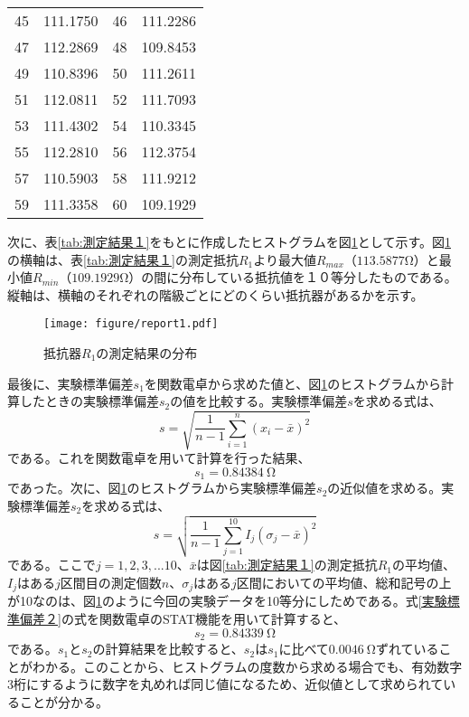 \documentclass[10pt,a4paper]{jsarticle}
\numberwithin{equation}{section}
\numberwithin{figure}{section}
\numberwithin{table}{section}
\begin{document}
\begin{table}[H]
\begin{center}
{\begin{tabular}{|c|c|c|c|}
          45&111.1750&46&111.2286\\
          47&112.2869&48&109.8453\\
          49&110.8396&50&111.2611\\
          51&112.0811&52&111.7093\\
          53&111.4302&54&110.3345\\
          55&112.2810&56&112.3754\\
          57&110.5903&58&111.9212\\
          59&111.3358&60&109.1929\\
          \hline
        \end{tabular}
      }
    \end{center}
  \end{table}
  \newpage
  次に、表\ref{tab:測定結果１}をもとに作成したヒストグラムを図\ref{fig:結果分布}として示す。図\ref{fig:結果分布}の横軸は、表\ref{tab:測定結果１}の測定抵抗$R_1$より最大値$R_{max}$（$113.5877\si{\ohm}$）と最小値$R_{min}$（$109.1929\si{\ohm}$）の間に分布している抵抗値を１０等分したものである。縦軸は、横軸のそれぞれの階級ごとにどのくらい抵抗器があるかを示す。
  \begin{figure}[H]
    \begin{center}
      \texttt{[image: figure/report1.pdf]}
      \caption{抵抗器$R_1$の測定結果の分布}\label{fig:結果分布}
    \end{center}
  \end{figure}
  最後に、実験標準偏差$s_1$を関数電卓から求めた値と、図\ref{fig:結果分布}のヒストグラムから計算したときの実験標準偏差$s_2$の値を比較する。実験標準偏差$s$を求める式は、
  \begin{equation}
    s=\sqrt{\dfrac{1}{n-1} \sum_{i=1}^{n} (x_i-\bar{x})^2}\label{実験標準偏差１}
  \end{equation}
  である。これを関数電卓を用いて計算を行った結果、
  \begin{equation}
    s_1 = 0.84384\:\si{\ohm}
  \end{equation}
  であった。次に、図\ref{fig:結果分布}のヒストグラムから実験標準偏差$s_2$の近似値を求める。実験標準偏差$s_2$を求める式は、
  \begin{equation}
    s=\sqrt{\dfrac{1}{n-1} \sum_{j=1}^{10} I_j (\sigma_j - \bar{x})^2}\label{実験標準偏差２}
  \end{equation}
  である。ここで$j=1,2,3,...10$、$\bar{x}$は図\ref{tab:測定結果１}の測定抵抗$R_1$の平均値、$I_j$はある$j$区間目の測定個数$n$、$\sigma_j$はある$j$区間においての平均値、総和記号の上が10なのは、図\ref{fig:結果分布}のように今回の実験データを10等分にしためである。式\ref{実験標準偏差２}の式を関数電卓のSTAT機能を用いて計算すると、
  \begin{equation}
    s_2 = 0.84339\:\si{\ohm}
  \end{equation}
  である。$s_1$と$s_2$の計算結果を比較すると、$s_2$は$s_1$に比べて$0.0046\:\si{\ohm}$ずれていることがわかる。このことから、ヒストグラムの度数から求める場合でも、有効数字3桁にするように数字を丸めれば同じ値になるため、近似値として求められていることが分かる。
\end{document}
